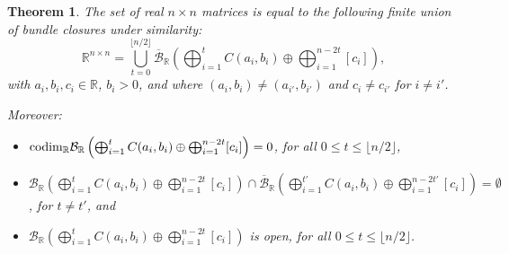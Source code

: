 \documentclass[a4paper]{article}
\newtheorem{theorem}{Theorem}[section]
\newcommand{\R}{\mathbb R}
\newcommand{\bunr}{{\mathcal B}_{\R}}
\newcommand{\cbunr}{{\overline{\mathcal B}}_{\R}}
\newcommand{\cod}{{\rm codim}_\R}
\begin{document}
\begin{theorem}\label{main.th}
    The set of real $n\times n$ matrices is equal to the following finite union of bundle closures under similarity:
    \begin{equation}\label{mainid}
    \R^{n\times n}=\bigcup_{t=0}^{\lfloor n/2\rfloor}\cbunr \left(\bigoplus_{i=1}^tC(a_i,b_i)\oplus\bigoplus_{i=1}^{n-2t}[c_i]\right),
    \end{equation}
    with $a_i,b_i,c_i\in\R$, $b_i >0$, and where $(a_i,b_i) \neq (a_{i'}, b_{i'})$ and $c_i\neq c_{i'}$ for $i\neq i'$.

    Moreover:
    \begin{itemize}
        \item[\rm(i)] $\cod\bunr \left(\bigoplus_{i=1}^tC(a_i,b_i)\oplus\bigoplus_{i=1}^{n-2t}[c_i]\right)=0$, for all $0\leq t\leq \lfloor n/2\rfloor$,
        \item[\rm(ii)]  $\bunr \left(\bigoplus_{i=1}^tC(a_i,b_i)\oplus\bigoplus_{i=1}^{n-2t}[c_i]\right)\cap\cbunr \left(\bigoplus_{i=1}^{t'}C(a_i,b_i)\oplus\bigoplus_{i=1}^{n-2t'}[c_i]\right)=\emptyset$, for $t\neq t'$, and
        \item[\rm(iii)] $\bunr \left(\bigoplus_{i=1}^tC(a_i,b_i)\oplus\bigoplus_{i=1}^{n-2t}[c_i]\right)$ is open, for all $0\leq t\leq\lfloor n/2\rfloor$.
    \end{itemize}
\end{theorem}
\end{document}

